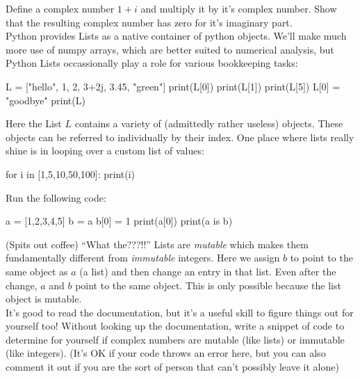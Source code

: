 \plot Define a complex number $1+i$ and multiply it by it's complex
number.  Show that the resulting complex number has zero for it's
imaginary part.\\

Python provides Lists as a native container of python objects.  We'll
make much more use of numpy arrays, which are better suited to
numerical analysis, but Python Lists occassionally play a role for various
bookkeeping tasks:
\begin{python}
L = ["hello", 1, 2, 3+2j, 3.45, "green"]
print(L[0])
print(L[1])
print(L[5])
L[0] = "goodbye"
print(L)
\end{python}
Here the List $L$ contains a variety of (admittedly rather useless)
objects.  These objects can be referred to individually by their
index.  One place where lists really shine is in looping over a
custom list of values:
\begin{python}
for i in [1,5,10,50,100]:
    print(i)
\end{python}

\vskip 0.25cm
\plot Run the following code:
\begin{python}
  a = [1,2,3,4,5]
  b = a
  b[0] = 1
  print(a[0])
  print(a is b)
\end{python}
(Spits out coffee) ``What the???!!''  Lists are {\em mutable} which makes
them fundamentally different from {\em immutable} integers.  Here
we assign $b$ to point to the same object as $a$ (a list) and then
change an entry in that list.  Even after the change, $a$ and $b$
point to the same object.  This is only possible because the list
object is mutable. \\

\plot It's good to read the documentation, but it's a useful skill to
figure things out for yourself too!  Without looking up the
documentation, write a snippet of code to determine for yourself if
complex numbers are mutable (like lists) or immutable (like integers).
(It's OK if your code throws an error here, but you can also comment
it out if you are the sort of person that can't possibly leave it
alone)\\















